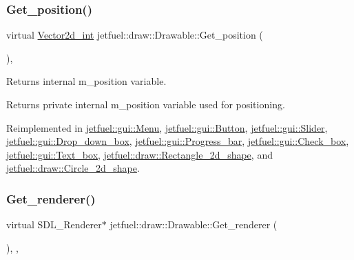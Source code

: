 \subsubsection{\texorpdfstring{Get\+\_\+position()}{Get\_position()}}
{\footnotesize\ttfamily virtual \hyperlink{classjetfuel_1_1draw_1_1Vector2d}{Vector2d\+\_\+int} jetfuel\+::draw\+::\+Drawable\+::\+Get\+\_\+position (\begin{DoxyParamCaption}{ }\end{DoxyParamCaption})\hspace{0.3cm}{\ttfamily [inline]}, {\ttfamily [virtual]}}



Returns internal m\+\_\+position variable. 

Returns private internal m\+\_\+position variable used for positioning. 

Reimplemented in \hyperlink{classjetfuel_1_1gui_1_1Menu_ac1aebb753feba17be808f2068ff17e74}{jetfuel\+::gui\+::\+Menu}, \hyperlink{classjetfuel_1_1gui_1_1Button_aadcceacaabaa40bceb293d1f91231d22}{jetfuel\+::gui\+::\+Button}, \hyperlink{classjetfuel_1_1gui_1_1Slider_a2b177c832a42ad21ca1fa88496ef7551}{jetfuel\+::gui\+::\+Slider}, \hyperlink{classjetfuel_1_1gui_1_1Drop__down__box_af92cccd010b21e1ce64af9a3c58ba086}{jetfuel\+::gui\+::\+Drop\+\_\+down\+\_\+box}, \hyperlink{classjetfuel_1_1gui_1_1Progress__bar_a5771ea71b321c173383e89537cea0ae1}{jetfuel\+::gui\+::\+Progress\+\_\+bar}, \hyperlink{classjetfuel_1_1gui_1_1Check__box_a7f14e8be560d0be5a05839442de1f18f}{jetfuel\+::gui\+::\+Check\+\_\+box}, \hyperlink{classjetfuel_1_1gui_1_1Text__box_ae59b52ecc11c9664307013e376f2cb29}{jetfuel\+::gui\+::\+Text\+\_\+box}, \hyperlink{classjetfuel_1_1draw_1_1Rectangle__2d__shape_a60aa3e0fa050e3fbd98177c1eef721b0}{jetfuel\+::draw\+::\+Rectangle\+\_\+2d\+\_\+shape}, and \hyperlink{classjetfuel_1_1draw_1_1Circle__2d__shape_a99b93544660c7f5b11cf8f0169e8fec1}{jetfuel\+::draw\+::\+Circle\+\_\+2d\+\_\+shape}.

\mbox{\label{classjetfuel_1_1draw_1_1Drawable_a6bbda81a7fbd33c388039ecaeb53c278}} 
\subsubsection{\texorpdfstring{Get\+\_\+renderer()}{Get\_renderer()}}
{\footnotesize\ttfamily virtual S\+D\+L\+\_\+\+Renderer$\ast$ jetfuel\+::draw\+::\+Drawable\+::\+Get\+\_\+renderer (\begin{DoxyParamCaption}{ }\end{DoxyParamCaption})\hspace{0.3cm}{\ttfamily [inline]}, {\ttfamily [protected]}, {\ttfamily [virtual]}}




